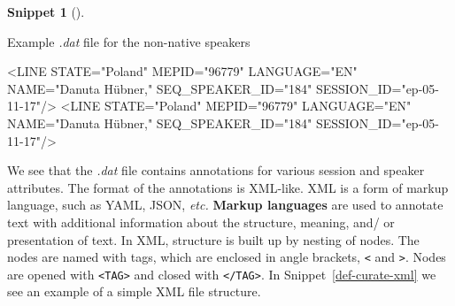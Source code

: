 \documentclass[
  letterpaper,
  krantz1]{latex/krantz-mod}
\newenvironment{Shaded}{\begin{snugshade}}{\end{snugshade}}
\newcommand{\KeywordTok}[1]{\textcolor[rgb]{0.00,0.00,0.00}{#1}}
\newcommand{\NormalTok}[1]{\textcolor[rgb]{0.00,0.00,0.00}{#1}}
\newcommand{\OtherTok}[1]{\textcolor[rgb]{0.00,0.00,0.00}{#1}}
\newcommand{\StringTok}[1]{\textcolor[rgb]{0.00,0.00,0.00}{#1}}
\theoremstyle{definition}
\newtheorem{definition}{Snippet}[chapter]
\theoremstyle{definition}
\theoremstyle{remark}
\begin{document}
\begin{definition}[]\protect\hypertarget{def-curate-enntt-nonnatives-dat}{}\label{def-curate-enntt-nonnatives-dat}

Example \emph{.dat} file for the non-native speakers

\begin{Shaded}
\begin{Highlighting}[]
\NormalTok{\textless{}}\KeywordTok{LINE}\OtherTok{ STATE=}\StringTok{"Poland"}\OtherTok{ MEPID=}\StringTok{"96779"}\OtherTok{ LANGUAGE=}\StringTok{"EN"}\OtherTok{ NAME=}\StringTok{"Danuta Hübner,"}\OtherTok{ SEQ\_SPEAKER\_ID=}\StringTok{"184"}\OtherTok{ SESSION\_ID=}\StringTok{"ep{-}05{-}11{-}17"}\NormalTok{/\textgreater{}}
\NormalTok{\textless{}}\KeywordTok{LINE}\OtherTok{ STATE=}\StringTok{"Poland"}\OtherTok{ MEPID=}\StringTok{"96779"}\OtherTok{ LANGUAGE=}\StringTok{"EN"}\OtherTok{ NAME=}\StringTok{"Danuta Hübner,"}\OtherTok{ SEQ\_SPEAKER\_ID=}\StringTok{"184"}\OtherTok{ SESSION\_ID=}\StringTok{"ep{-}05{-}11{-}17"}\NormalTok{/\textgreater{}}
\end{Highlighting}
\end{Shaded}

\end{definition}

We see that the \emph{.dat} file contains annotations for various
session and speaker attributes. The format of the annotations is
XML-like. XML is a form of markup language, such as YAML, JSON,
\emph{etc.} \textbf{Markup languages} are used to annotate text with
additional information about the structure, meaning, and/ or
presentation of text. In XML, structure is built up by nesting of nodes.
The nodes are named with tags, which are enclosed in angle brackets,
\texttt{\textless{}} and \texttt{\textgreater{}}. Nodes are opened with
\texttt{\textless{}TAG\textgreater{}} and closed with
\texttt{\textless{}/TAG\textgreater{}}. In Snippet~\ref{def-curate-xml}
we see an example of a simple XML file structure.
\end{document}
